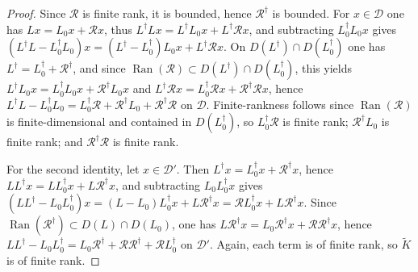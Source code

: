 \documentclass[11pt]{amsart}
\newcommand{\1}{\mathbbm{1}}
\theoremstyle{plain}
\theoremstyle{definition}
\theoremstyle{remark}
\numberwithin{equation}{section}
\begin{document}
\begin{proof}
Since \(\mathcal R\) is finite rank, it is bounded, hence \(\mathcal R^\dagger\) is bounded. For \(x\in\mathcal D\) one has \(Lx=L_0x+\mathcal R x\), thus \(L^\dagger Lx=L^\dagger L_0x+L^\dagger \mathcal R x\), and subtracting \(L_0^\dagger L_0x\) gives \((L^\dagger L-L_0^\dagger L_0)x=(L^\dagger-L_0^\dagger)L_0x+L^\dagger \mathcal R x\). On \(D(L^\dagger)\cap D(L_0^\dagger)\) one has \(L^\dagger=L_0^\dagger+\mathcal R^\dagger\), and since \(\operatorname{Ran}(\mathcal R)\subset D(L^\dagger)\cap D(L_0^\dagger)\), this yields \(L^\dagger L_0x=L_0^\dagger L_0x+\mathcal R^\dagger L_0x\) and \(L^\dagger \mathcal R x=L_0^\dagger \mathcal R x+\mathcal R^\dagger \mathcal R x\), hence \(L^\dagger L-L_0^\dagger L_0=L_0^\dagger \mathcal R+\mathcal R^\dagger L_0+\mathcal R^\dagger \mathcal R\) on \(\mathcal D\). Finite-rankness follows since \(\operatorname{Ran}(\mathcal R)\) is finite-dimensional and contained in \(D(L_0^\dagger)\), so \(L_0^\dagger \mathcal R\) is finite rank; \(\mathcal R^\dagger L_0\) is finite rank; and \(\mathcal R^\dagger \mathcal R\) is finite rank.

For the second identity, let \(x\in\mathcal D'\). Then \(L^\dagger x=L_0^\dagger x+\mathcal R^\dagger x\), hence \(LL^\dagger x=LL_0^\dagger x+L\mathcal R^\dagger x\), and subtracting \(L_0L_0^\dagger x\) gives \((LL^\dagger-L_0L_0^\dagger)x=(L-L_0)L_0^\dagger x+L\mathcal R^\dagger x=\mathcal R L_0^\dagger x+L\mathcal R^\dagger x\). Since \(\operatorname{Ran}(\mathcal R^\dagger)\subset D(L)\cap D(L_0)\), one has \(L\mathcal R^\dagger x=L_0\mathcal R^\dagger x+\mathcal R\mathcal R^\dagger x\), hence \(LL^\dagger-L_0L_0^\dagger=L_0\mathcal R^\dagger+\mathcal R\mathcal R^\dagger+\mathcal R L_0^\dagger\) on \(\mathcal D'\). Again, each term is of finite rank, so \(\widetilde K\) is of finite rank.
\end{proof}
\end{document}

